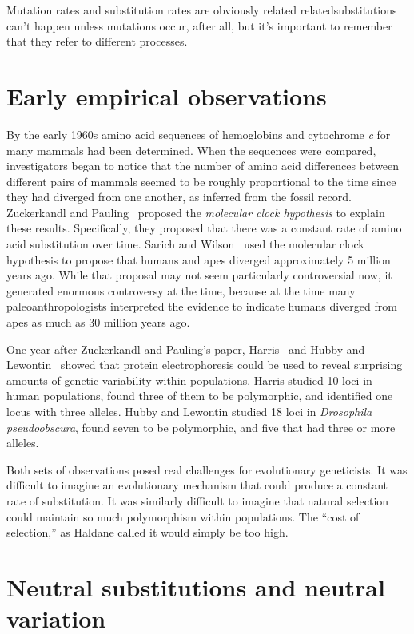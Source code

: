 \noindent Mutation rates and substitution rates are obviously related
related{\dash}substitutions can't happen unless mutations occur, after
all{\dash}, but it's important to remember that they refer to
different processes.

\section*{Early empirical observations}

By the early 1960s amino acid sequences of hemoglobins and cytochrome
{\it c\/} for many mammals had been determined. When the sequences
were compared, investigators began to notice that the number of amino
acid differences between different pairs of mammals seemed to be
roughly proportional to the time since they had diverged from one
another, as inferred from the fossil record. Zuckerkandl and
Pauling~\cite{Zuckerkandl-Pauling65} proposed the {\it molecular clock
hypothesis\/} to explain these results. Specifically, they proposed
that there was a constant rate of amino acid substitution over
time. Sarich and Wilson~\cite{Sarich-Wilson67,Wilson-Sarich69} used
the molecular clock hypothesis to propose that humans and apes
diverged approximately 5 million years ago. While that proposal may
not seem particularly controversial now, it generated enormous
controversy at the time, because at the time many paleoanthropologists
interpreted the evidence to indicate humans diverged from apes as much
as 30 million years ago.

One year after Zuckerkandl and Pauling's paper, Harris~\cite{Harris66}
and Hubby and Lewontin~\cite{Hubby-Lewontin66,Lewontin-Hubby66} showed
that protein electrophoresis could be used to reveal surprising
amounts of genetic variability within populations. Harris studied
10 loci in human populations, found three of them to be polymorphic,
and identified one locus with three alleles. Hubby and Lewontin
studied 18 loci in {\it Drosophila pseudoobscura\/}, found seven to be
polymorphic, and five that had three or more alleles.

Both sets of observations posed real challenges for evolutionary
geneticists. It was difficult to imagine an evolutionary mechanism
that could produce a constant rate of substitution. It was similarly
difficult to imagine that natural selection could maintain so much
polymorphism within populations. The ``cost of selection,'' as Haldane
called it would simply be too high.

\section*{Neutral substitutions and neutral variation}

